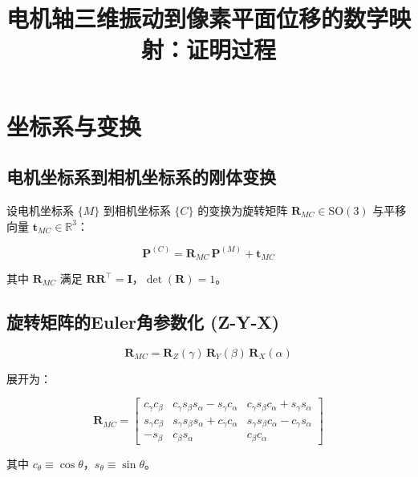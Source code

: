 \documentclass[12pt,a4paper]{article}
\title{电机轴三维振动到像素平面位移的数学映射：证明过程}
\author{}
\date{}
\begin{document}
\maketitle

\tableofcontents

\newpage

\section{坐标系与变换}

\subsection{电机坐标系到相机坐标系的刚体变换}

设电机坐标系 $\{M\}$ 到相机坐标系 $\{C\}$ 的变换为旋转矩阵 $\mathbf{R}_{MC} \in \mathrm{SO}(3)$ 与平移向量 $\mathbf{t}_{MC} \in \mathbb{R}^3$：

\begin{equation}
\mathbf{P}^{(C)} = \mathbf{R}_{MC} \, \mathbf{P}^{(M)} + \mathbf{t}_{MC}
\label{eq:rigid_transform}
\end{equation}

其中 $\mathbf{R}_{MC}$ 满足 $\mathbf{R} \mathbf{R}^{\top} = \mathbf{I}$，$\det(\mathbf{R}) = 1$。

\subsection{旋转矩阵的Euler角参数化 (Z-Y-X)}

\begin{equation}
\mathbf{R}_{MC} = \mathbf{R}_Z(\gamma) \, \mathbf{R}_Y(\beta) \, \mathbf{R}_X(\alpha)
\label{eq:euler_rotation}
\end{equation}

展开为：

\begin{equation}
\mathbf{R}_{MC} =
\begin{bmatrix}
c_\gamma c_\beta & c_\gamma s_\beta s_\alpha - s_\gamma c_\alpha & c_\gamma s_\beta c_\alpha + s_\gamma s_\alpha \\
s_\gamma c_\beta & s_\gamma s_\beta s_\alpha + c_\gamma c_\alpha & s_\gamma s_\beta c_\alpha - c_\gamma s_\alpha \\
-s_\beta & c_\beta s_\alpha & c_\beta c_\alpha
\end{bmatrix}
\label{eq:rotation_matrix}
\end{equation}

其中 $c_\theta \equiv \cos\theta$，$s_\theta \equiv \sin\theta$。
\end{document}
